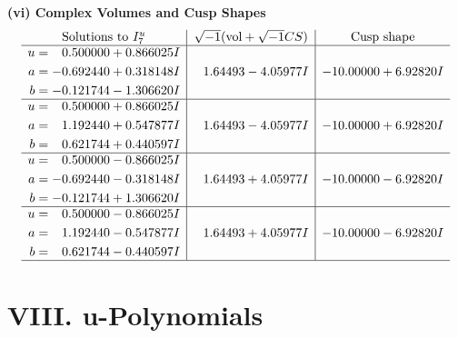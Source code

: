 \documentclass[1p]{elsarticle_modified}
\theoremstyle{definition}
\newcommand{\I}{\sqrt{-1}}
\begin{document}
\newpage\flushleft \textbf{(vi) Complex Volumes and Cusp Shapes}
$$\begin{array}{c|c|c}  
\text{Solutions to }I^u_{7}& \I (\text{vol} + \sqrt{-1}CS) & \text{Cusp shape}\\
 \hline 
\begin{aligned}
u &= \phantom{-}0.500000 + 0.866025 I \\
a &= -0.692440 + 0.318148 I \\
b &= -0.121744 - 1.306620 I\end{aligned}
 & \phantom{-}1.64493 - 4.05977 I & -10.00000 + 6.92820 I \\ \hline\begin{aligned}
u &= \phantom{-}0.500000 + 0.866025 I \\
a &= \phantom{-}1.192440 + 0.547877 I \\
b &= \phantom{-}0.621744 + 0.440597 I\end{aligned}
 & \phantom{-}1.64493 - 4.05977 I & -10.00000 + 6.92820 I \\ \hline\begin{aligned}
u &= \phantom{-}0.500000 - 0.866025 I \\
a &= -0.692440 - 0.318148 I \\
b &= -0.121744 + 1.306620 I\end{aligned}
 & \phantom{-}1.64493 + 4.05977 I & -10.00000 - 6.92820 I \\ \hline\begin{aligned}
u &= \phantom{-}0.500000 - 0.866025 I \\
a &= \phantom{-}1.192440 - 0.547877 I \\
b &= \phantom{-}0.621744 - 0.440597 I\end{aligned}
 & \phantom{-}1.64493 + 4.05977 I & -10.00000 - 6.92820 I\\
 \hline 
 \end{array}$$\newpage
\newpage\renewcommand{\arraystretch}{1}
\centering \section*{ VIII. u-Polynomials}
\end{document}
